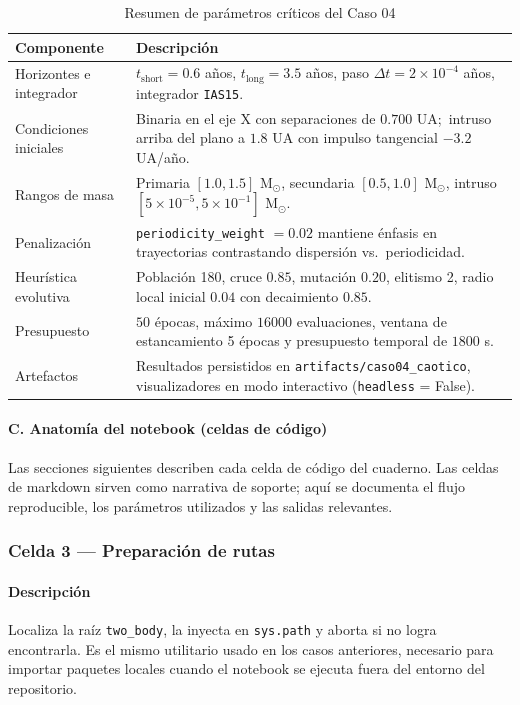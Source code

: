 \begin{table}[H]
\centering
\caption{Resumen de parámetros críticos del Caso 04}
\label{tab:c04_params} %
\begin{tabularx}{\textwidth}{@{}l>{\raggedright\arraybackslash}X@{}}
\toprule
\textbf{Componente} & \textbf{Descripción} \\
\midrule
Horizontes e integrador & $t_{\text{short}} = 0.6$ años, $t_{\text{long}} = 3.5$ años, paso $\Delta t = 2\times10^{-4}$ años, integrador \texttt{IAS15}. \\
Condiciones iniciales & Binaria en el eje X con separaciones de $0.700$ UA;\ intruso arriba del plano a $1.8$ UA con impulso tangencial $-3.2$ UA/año. \\
Rangos de masa & Primaria $[1.0, 1.5]$ M$_\odot$, secundaria $[0.5, 1.0]$ M$_\odot$, intruso $[5\times 10^{-5}, 5\times 10^{-1}]$ M$_\odot$. \\
Penalización & \texttt{periodicity\_weight} $= 0.02$ mantiene énfasis en trayectorias contrastando dispersión vs.\ periodicidad. \\
Heurística evolutiva & Población 180, cruce $0.85$, mutación $0.20$, elitismo 2, radio local inicial $0.04$ con decaimiento $0.85$. \\
Presupuesto & $50$ épocas, máximo $16000$ evaluaciones, ventana de estancamiento 5 épocas y presupuesto temporal de $1800$ s. \\
Artefactos & Resultados persistidos en \texttt{artifacts/caso04\_caotico}, visualizadores en modo interactivo (\texttt{headless} = False). \\
\bottomrule
\end{tabularx}
\end{table}

\paragraph{C. Anatomía del notebook (celdas de código)}
Las secciones siguientes describen cada celda de código del cuaderno. Las celdas de markdown sirven como narrativa de soporte; aquí se documenta el flujo reproducible, los parámetros utilizados y las salidas relevantes.

\subsubsection*{Celda 3 — Preparación de rutas}
\paragraph{Descripción} Localiza la raíz \texttt{two\_body}, la inyecta en \texttt{sys.path} y aborta si no logra encontrarla. Es el mismo utilitario usado en los casos anteriores, necesario para importar paquetes locales cuando el notebook se ejecuta fuera del entorno del repositorio.
